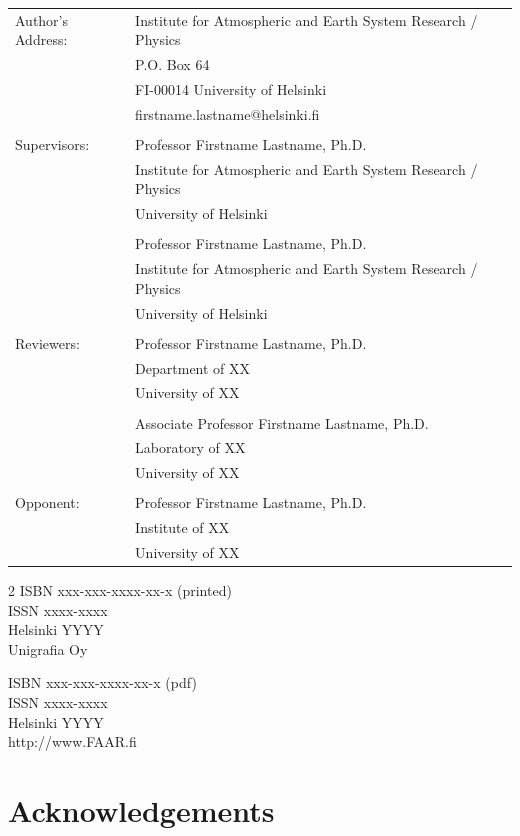 \documentclass[a4paper,12pt]{article}
\begin{document}
\begin{center}
\begin{tabular}{ll}
Author's Address:
& Institute for Atmospheric and Earth System Research / Physics \\
& P.O. Box 64 \\
& FI-00014 University of Helsinki \\
& firstname.lastname@helsinki.fi \\
\\
Supervisors:
& Professor Firstname Lastname, Ph.D.\\
& Institute for Atmospheric and Earth System Research / Physics\\
& University of Helsinki\\
\\
& Professor Firstname Lastname, Ph.D.\\
& Institute for Atmospheric and Earth System Research / Physics\\
& University of Helsinki\\
\\
Reviewers:
& Professor Firstname Lastname, Ph.D.\\
& Department of XX\\
& University of XX\\
\\
& Associate Professor Firstname Lastname, Ph.D.\\
& Laboratory of XX\\
& University of XX\\
\\
Opponent:
& Professor Firstname Lastname, Ph.D. \\
& Institute of XX \\
& University of XX
\end{tabular}

\vfill

\begin{multicols}{2}
ISBN  xxx-xxx-xxxx-xx-x (printed) \\
ISSN xxxx-xxxx \\
Helsinki YYYY \\
Unigrafia Oy

ISBN  xxx-xxx-xxxx-xx-x (pdf) \\
ISSN xxxx-xxxx \\
Helsinki YYYY \\
http://www.FAAR.fi
\end{multicols}
\end{center}

\newpage

\section*{Acknowledgements}
\lipsum[1]
\end{document}
